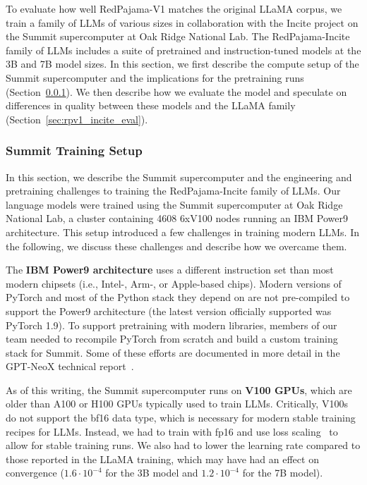 \documentclass{article}
\begin{document}
To evaluate how well RedPajama-V1 matches the original LLaMA corpus, we train a family of LLMs of various sizes in collaboration with the Incite project on the Summit supercomputer at Oak Ridge National Lab.
The RedPajama-Incite family of LLMs includes a suite of pretrained and instruction-tuned models at the 3B and 7B model sizes.
In this section, we first describe the compute setup of the Summit supercomputer and the implications for the pretraining runs (Section~\ref{sec:rpv1_incite_summit}).
We then describe how we evaluate the model and speculate on differences in quality between these models and the LLaMA family (Section~\ref{sec:rpv1_incite_eval}).

\subsubsection{Summit Training Setup}
\label{sec:rpv1_incite_summit}

In this section, we describe the Summit supercomputer and the engineering and pretraining challenges to training the RedPajama-Incite family of LLMs.
Our language models were trained using the Summit supercomputer at Oak Ridge National Lab, a cluster containing 4608 6xV100 nodes running an IBM Power9 architecture. This setup introduced a few challenges in training modern LLMs. In the following, we discuss these challenges and describe how we overcame them.

The \textbf{IBM Power9 architecture} uses a different instruction set than most modern chipsets (i.e., Intel-, Arm-, or Apple-based chips).
Modern versions of PyTorch and most of the Python stack they depend on are not pre-compiled to support the Power9 architecture (the latest version officially supported was PyTorch 1.9).
To support pretraining with modern libraries, members of our team needed to recompile PyTorch from scratch and build a custom training stack for Summit.
Some of these efforts are documented in more detail in the GPT-NeoX technical report~\cite{black2022gpt}.

As of this writing, the Summit supercomputer runs on \textbf{V100 GPUs}, which are older than A100 or H100 GPUs typically used to train LLMs.
Critically, V100s do not support the bf16 data type, which is necessary for modern stable training recipes for LLMs.
Instead, we had to train with fp16 and use loss scaling~\cite{micikevicius2017mixed} to allow for stable training runs.
We also had to lower the learning rate compared to those reported in the LLaMA training, which may have had an effect on convergence ($1.6\cdot 10^{-4}$ for the 3B model and $1.2\cdot10^{-4}$ for the 7B model).
\end{document}
